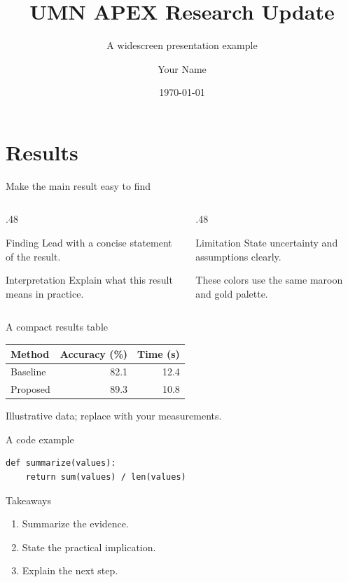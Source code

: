 \documentclass[11pt]{beamer}
\title{UMN APEX Research Update}
\subtitle{A widescreen presentation example}
\author{Your Name}
\institute{University of Minnesota}
\date{\today}
\begin{document}
\begin{frame}
  \titlepage
\end{frame}
\section{Results}
\begin{frame}{Make the main result easy to find}
  \begin{columns}[T,onlytextwidth]
    \begin{column}{.48\textwidth}
      \begin{block}{Finding}
        Lead with a concise statement of the result.
      \end{block}
      \begin{exampleblock}{Interpretation}
        Explain what this result means in practice.
      \end{exampleblock}
    \end{column}
    \begin{column}{.48\textwidth}
      \begin{alertblock}{Limitation}
        State uncertainty and assumptions clearly.
      \end{alertblock}
      These colors use the same maroon and gold palette.
    \end{column}
  \end{columns}
\end{frame}
\begin{frame}{A compact results table}
  \centering
  \begin{tabular}{lrr}
    \toprule
    Method & Accuracy (\%) & Time (s) \\
    \midrule
    Baseline & 82.1 & 12.4 \\
    Proposed & 89.3 & 10.8 \\
    \bottomrule
  \end{tabular}
  \vfill
  {\footnotesize Illustrative data; replace with your measurements.}
\end{frame}
\begin{frame}[fragile]{A code example}
  \begin{verbatim}
def summarize(values):
    return sum(values) / len(values)
  \end{verbatim}
\end{frame}
\begin{frame}{Takeaways}
  \begin{enumerate}
    \item Summarize the evidence.
    \item State the practical implication.
    \item Explain the next step.
  \end{enumerate}
\end{frame}
\end{document}
